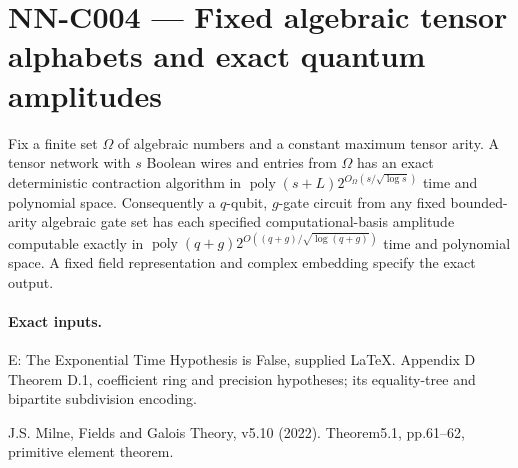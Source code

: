 \section{NN-C004 --- Fixed algebraic tensor alphabets and exact quantum amplitudes}
\begin{proposition}[NN-C004]
Fix a finite set $\Omega$ of algebraic numbers and a constant maximum tensor arity. A tensor network with $s$ Boolean wires and entries from $\Omega$ has an exact deterministic contraction algorithm in $\operatorname{poly}(s+L)2^{O_\Omega(s/\sqrt{\log s})}$ time and polynomial space. Consequently a $q$-qubit, $g$-gate circuit from any fixed bounded-arity algebraic gate set has each specified computational-basis amplitude computable exactly in $\operatorname{poly}(q+g)2^{O((q+g)/\sqrt{\log(q+g)})}$ time and polynomial space. A fixed field representation and complex embedding specify the exact output.
\end{proposition}
\paragraph{Exact inputs.}
E: The Exponential Time Hypothesis is False, supplied LaTeX. Appendix D Theorem D.1, coefficient ring and precision hypotheses; its equality-tree and bipartite subdivision encoding.

J.S. Milne, Fields and Galois Theory, v5.10 (2022). Theorem5.1, pp.61--62, primitive element theorem.

